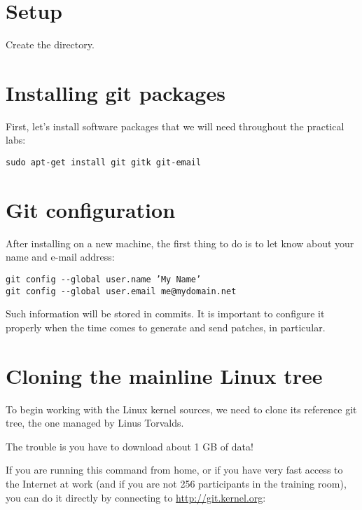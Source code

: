 
\section{Setup}

Create the  directory.

\section{Installing git packages}

First, let's install software packages that we will need
throughout the practical labs:

\begin{verbatim}
sudo apt-get install git gitk git-email
\end{verbatim}

\section{Git configuration}

After installing  on a new machine, the first thing to do is
to let  know about your name and e-mail address:

\begin{verbatim}
git config --global user.name ’My Name’
git config --global user.email me@mydomain.net
\end{verbatim}

Such information will be stored in commits. It is important
to configure it properly when the time comes to generate and
send patches, in particular.

\section{Cloning the mainline Linux tree}

To begin working with the Linux kernel sources, we need to clone its
reference git tree, the one managed by Linus Torvalds.

The trouble is you have to download about 1 GB of data!

If you are running this command from home, or if you have very fast
access to the Internet at work (and if you are not 256 participants in the
training room), you can do it directly by connecting to
\url{http://git.kernel.org}:

